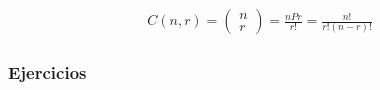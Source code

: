 \begin{Def}[Combinaciones]

\end{Def}


\begin{Teo}
\begin{eqnarray}
C\left(n,r\right)=\left(\begin{array}{c}
n\\
r
\end{array}\right)=\frac{nPr}{r!}=\frac{n!}{r!\left(n-r\right)!}
\end{eqnarray}
\end{Teo}
\subsubsection*{Ejercicios}

